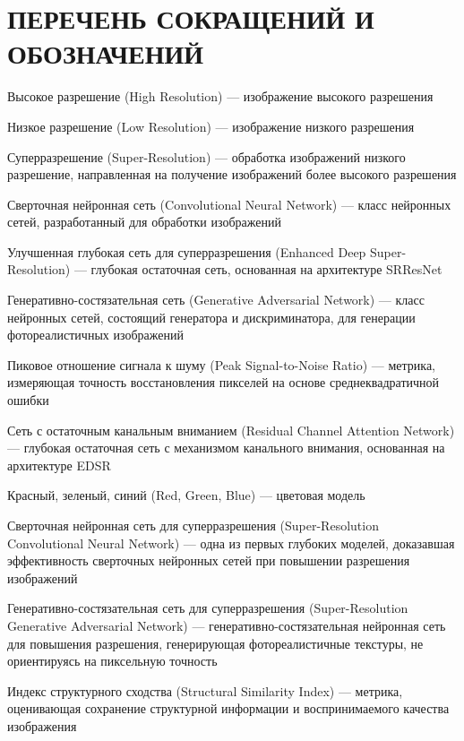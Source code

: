 \chapter*{ПЕРЕЧЕНЬ СОКРАЩЕНИЙ И ОБОЗНАЧЕНИЙ}

\noindent
\begin{description}[leftmargin=3cm, labelwidth=2.5cm, labelsep=0.5cm, align=left]
    \item[ВР] Высокое разрешение (High Resolution) --- изображение высокого разрешения
    \item[НР] Низкое разрешение (Low Resolution) --- изображение низкого разрешения
    \item[СР] Суперразрешение (Super-Resolution) --- обработка изображений низкого разрешение, направленная на получение изображений более высокого разрешения
    \item[CNN] Сверточная нейронная сеть (Convolutional Neural Network) --- класс нейронных сетей, разработанный для обработки изображений
    \item[EDSR]  Улучшенная глубокая сеть для суперразрешения (Enhanced Deep Super-Resolution) --- глубокая остаточная сеть, основанная на архитектуре SRResNet
    \item[GAN] Генеративно-состязательная сеть (Generative Adversarial Network) --- класс нейронных сетей, состоящий генератора и дискриминатора, для генерации фотореалистичных изображений
    \item[PSNR] Пиковое отношение сигнала к шуму (Peak Signal-to-Noise Ratio) --- метрика, измеряющая точность восстановления пикселей на основе среднеквадратичной ошибки
    \item[RCAN] Сеть с остаточным канальным вниманием (Residual Channel Attention Network) --- глубокая остаточная сеть с механизмом канального внимания, основанная на архитектуре EDSR
    \item[RGB] Красный, зеленый, синий (Red, Green, Blue) — цветовая модель
    \item[SRCNN] Сверточная нейронная сеть для суперразрешения (Super-Resolution Convolutional Neural Network) --- одна из первых глубоких моделей, доказавшая эффективность сверточных нейронных сетей при повышении разрешения изображений
    \item[SRGAN] Генеративно-состязательная сеть для суперразрешения (Super-Resolution Generative Adversarial Network) --- генеративно-состязательная нейронная сеть для повышения разрешения, генерирующая фотореалистичные текстуры, не ориентируясь на пиксельную точность
    \item[SSIM] Индекс структурного сходства (Structural Similarity Index) --- метрика, оценивающая сохранение структурной информации и воспринимаемого качества изображения
\end{description}
